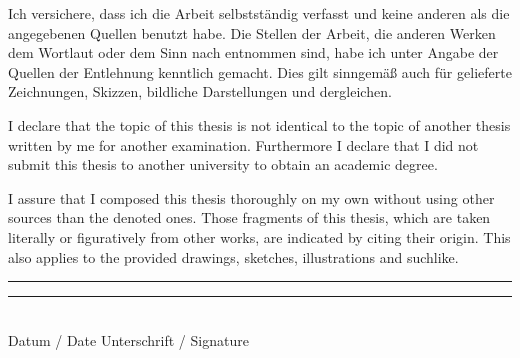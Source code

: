 \documentclass[11pt, a4paper]{article}
\begin{document}
\vspace{0.8cm}
Ich versichere, dass ich die Arbeit selbstständig verfasst und keine anderen als die angegebenen Quellen benutzt habe. Die Stellen der Arbeit, die anderen Werken dem Wortlaut oder dem Sinn nach entnommen sind, habe ich unter Angabe der Quellen der Entlehnung kenntlich gemacht. Dies gilt sinngemäß auch für gelieferte Zeichnungen, Skizzen, bildliche Darstellungen und dergleichen.

\vspace{2cm}
I declare that the topic of this thesis is not identical to the topic of another thesis written by me for another examination. Furthermore I declare that I did not submit this thesis to another university to obtain an academic degree.

\vspace{0.8cm}
I assure that I composed this thesis thoroughly on my own without using other sources than the denoted ones. Those fragments of this thesis, which are taken literally or figuratively from other works, are indicated by citing their origin. This also applies to the provided drawings, sketches, illustrations and suchlike.

\vspace{1.5cm}
\rule[0.05cm]{5cm}{0.5pt} \hspace{4.5cm} \rule[0.05cm]{5cm}{0.5pt}\\
Datum / Date \hspace{7.1cm} Unterschrift / Signature
\end{document}
